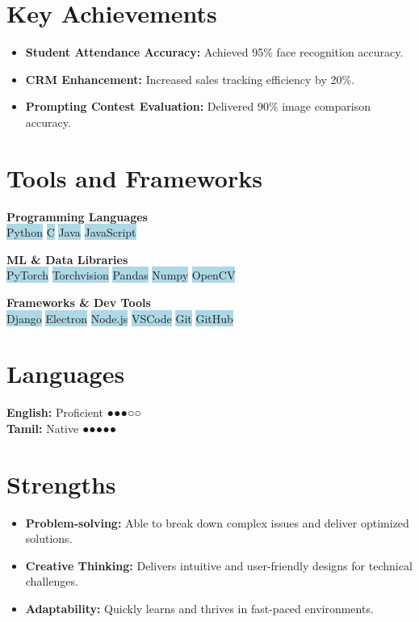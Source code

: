 \documentclass[11pt,a4paper]{article}
\begin{document}
\section*{Key Achievements}
\begin{itemize}[noitemsep]
  \item \textbf{Student Attendance Accuracy:} Achieved 95\% face recognition accuracy.
  \item \textbf{CRM Enhancement:} Increased sales tracking efficiency by 20\%.
  \item \textbf{Prompting Contest Evaluation:} Delivered 90\% image comparison accuracy.
\end{itemize}

\section*{Tools and Frameworks}

\textbf{Programming Languages} \\
\colorbox{lightblue}{Python} \quad
\colorbox{lightblue}{C} \quad
\colorbox{lightblue}{Java} \quad
\colorbox{lightblue}{JavaScript}

\vspace{6pt}

\textbf{ML \& Data Libraries} \\
\colorbox{lightblue}{PyTorch} \quad
\colorbox{lightblue}{Torchvision} \quad
\colorbox{lightblue}{Pandas} \quad
\colorbox{lightblue}{Numpy} \quad
\colorbox{lightblue}{OpenCV}

\vspace{6pt}

\textbf{Frameworks \& Dev Tools} \\
\colorbox{lightblue}{Django} \quad
\colorbox{lightblue}{Electron} \quad
\colorbox{lightblue}{Node.js} \quad
\colorbox{lightblue}{VSCode} \quad
\colorbox{lightblue}{Git} \quad
\colorbox{lightblue}{GitHub}

\section*{Languages}
\textbf{English:} Proficient \quad ●●●○○ \\
\textbf{Tamil:} Native \quad ●●●●●

\section*{Strengths}
\begin{itemize}[noitemsep]
  \item \textbf{Problem-solving:} Able to break down complex issues and deliver optimized solutions.
  \item \textbf{Creative Thinking:} Delivers intuitive and user-friendly designs for technical challenges.
  \item \textbf{Adaptability:} Quickly learns and thrives in fast-paced environments.
\end{itemize}
\end{document}
